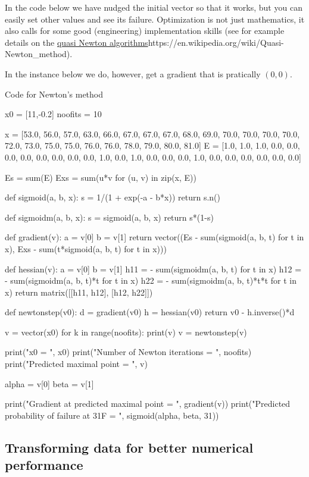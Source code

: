 \documentclass{article}
\begin{document}
\begin{example}
In the code below we have nudged the initial vector so that it works, but you
can easily set other values and see its failure. Optimization is not just mathematics, it also calls
for some good (engineering) implementation skills (see for example details on the
\url{quasi Newton algorithms}{https://en.wikipedia.org/wiki/Quasi-Newton_method}).

In the instance below we do, however, get a gradient that is pratically $(0, 0)$.
  
\begin{hideinbutton}{Code for Newton's method}
\begin{sage}
x0 = [11,-0.2] 
noofits = 10
  

x = [53.0, 56.0, 57.0, 63.0, 66.0, 67.0, 67.0, 67.0, 68.0, 69.0, 70.0, 70.0, 70.0, 70.0, 72.0, 73.0, 75.0, 75.0, 76.0, 76.0, 78.0, 79.0, 80.0, 81.0]
E = [1.0, 1.0, 1.0, 0.0, 0.0, 0.0, 0.0, 0.0, 0.0, 0.0, 0.0, 1.0, 0.0, 1.0, 0.0, 0.0, 0.0, 1.0, 0.0, 0.0, 0.0, 0.0, 0.0, 0.0]

Es = sum(E)
Exs = sum(u*v for (u, v) in zip(x, E))
    
def sigmoid(a, b, x):
  s = 1/(1 + exp(-a - b*x))
  return s.n()

def sigmoidm(a, b, x):
  s = sigmoid(a, b, x)
  return s*(1-s)
      
def gradient(v):
  a = v[0]
  b = v[1]
  return vector((Es - sum(sigmoid(a, b, t) for t in x), Exs - sum(t*sigmoid(a, b, t) for t in x)))
    
def hessian(v):
  a = v[0]
  b = v[1]
  h11 = - sum(sigmoidm(a, b, t) for t in x)
  h12 = - sum(sigmoidm(a, b, t)*t for t in x)
  h22 = - sum(sigmoidm(a, b, t)*t*t for t in x)
  return matrix([[h11, h12], [h12, h22]])

def newtonstep(v0):
  d = gradient(v0)
  h = hessian(v0)
  return v0 - h.inverse()*d

v = vector(x0)  
for k in range(noofits):
  print(v)
  v = newtonstep(v)

print("x0 = ", x0)
print("Number of Newton iterations =  ", noofits)
print("Predicted maximal point =  ", v)

alpha = v[0]
beta = v[1]

print("Gradient at predicted maximal point = ", gradient(v))
print("Predicted probability of failure at 31F = ", sigmoid(alpha, beta, 31))
\end{sage} 
\end{hideinbutton}
\end{example}


\subsection{Transforming data for better numerical performance}
\end{document}

